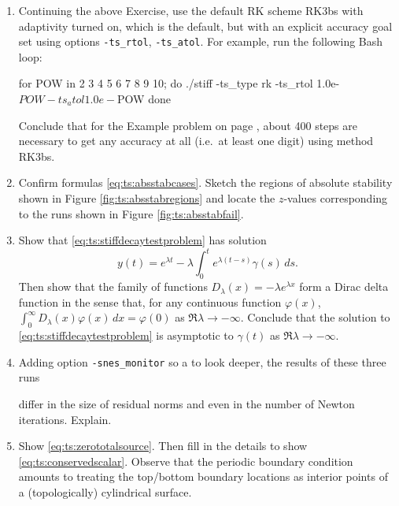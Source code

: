 \begin{enumerate}
\item \label{exer:ts:stiffadaptive}  Continuing the above Exercise, use the default RK scheme RK3bs with adaptivity turned on, which is the default, but with an explicit accuracy goal set using options \texttt{-ts\_rtol}, \texttt{-ts\_atol}.  For example, run the following Bash loop:
\begin{code}
for POW in 2 3 4 5 6 7 8 9 10; do
    ./stiff -ts_type rk -ts_rtol 1.0e-$POW -ts_atol 1.0e-$POW
done
\end{code}
Conclude that for the Example problem on page \pageref{ex:ts:odestiff}, about 400 steps are necessary to get any accuracy at all (i.e.~at least one digit) using method RK3bs.

\item \label{exer:ts:absstabcases}  Confirm formulas \eqref{eq:ts:absstabcases}.  Sketch the regions of absolute stability shown in Figure \ref{fig:ts:absstabregions} and locate the $z$-values corresponding to the runs shown in Figure \ref{fig:ts:absstabfail}.

\item \label{exer:ts:stiffdecayasymptotic}  Show that \eqref{eq:ts:stiffdecaytestproblem} has solution
    $$y(t) = e^{\lambda t} - \lambda \int_0^t e^{\lambda (t-s)} \gamma(s)\,ds.$$
Then show that the family of functions $D_\lambda(x) = -\lambda e^{\lambda x}$ form a Dirac delta function \citep{Evans2010} in the sense that, for any continuous function $\varphi(x)$, $\int_{0}^\infty D_\lambda(x) \varphi(x)\,dx = \varphi(0)$ as $\Re\lambda \to -\infty$.  Conclude that the solution to \eqref{eq:ts:stiffdecaytestproblem} is asymptotic to $\gamma(t)$ as $\Re\lambda \to -\infty$.

\item \label{exer:ts:fdjacobian}   Adding option \texttt{-snes\_monitor} so a to look deeper, the results of these three runs
differ in the size of residual norms and even in the number of Newton iterations.  Explain.

\item \label{exer:ts:zerototalsource}  Show \eqref{eq:ts:zerototalsource}.  Then fill in the details to show \eqref{eq:ts:conservedscalar}.  Observe that the periodic boundary condition amounts to treating the top/bottom boundary locations as interior points of a (topologically) cylindrical surface.


\end{enumerate}
